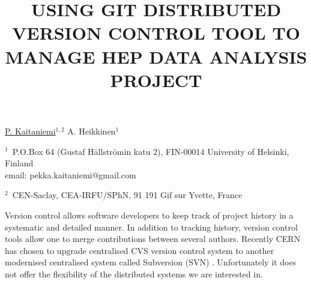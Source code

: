 \documentclass[12pt]{article}
\begin{document}
\title{USING GIT DISTRIBUTED VERSION CONTROL TOOL TO MANAGE HEP DATA ANALYSIS PROJECT}
\underline{P. Kaitaniemi}$^{1, 2}$ A. Heikkinen$^1$ 

$^1$~P.O.Box 64 (Gustaf H\"allstr\"omin katu 2), FIN-00014 University of Helsinki, Finland\\
email: pekka.kaitaniemi@gmail.com

$^2$~CEN-Saclay, CEA-IRFU/SPhN, 91 191 Gif sur Yvette, France
\vspace{\baselineskip}

Version control allows software developers to keep track of project history in
a systematic and detailed manner. 
In addition to tracking history, version control tools allow
one to merge contributions between several authors.
Recently CERN has chosen to upgrade centralised CVS version control
system \cite{cernsvn} to another modernised centralised system called Subversion (SVN) \cite{svnsite}.
Unfortunately it does not offer the flexibility of the
distributed systems we are interested in. 

\end{document}
